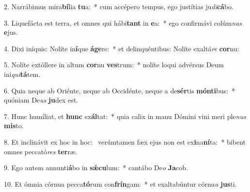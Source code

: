 2. Narrábimus mira\textbf{bí}lia \textbf{tu}a:~*  cum accépero tempus, ego justítias ju\textit{di}\textbf{cá}bo.\

3. Liquefácta est terra, et omnes qui hábi\textbf{tant} in \textbf{e}a:~*  ego confirmávi colúm\textit{nas} \textbf{e}jus.\

4. Dixi iníquis: Nolíte in\textbf{í}que \textbf{á}\textbf{ge}re:~*  et delinquéntibus: Nolíte exaltá\textit{re} \textbf{cor}nu:\

5. Nolíte extóllere in altum \textbf{cor}nu \textbf{ves}trum:~*  nolíte loqui advérsus Deum ini\textit{qui}\textbf{tá}tem.\

6. Quia neque ab Oriénte, neque ab Occidénte, neque a de\textbf{sér}tis \textbf{món}\textbf{ti}bus:~*  quóniam De\textit{us} \textbf{ju}dex est.\

7. Hunc humíliat, et \textbf{hunc} ex\textbf{ál}tat:~*  quia calix in manu Dómini vini meri ple\textit{nus} \textbf{mis}to.\

8. Et inclinávit ex hoc in hoc: \dag\  verúmtamen fæx ejus non est ex\textbf{i}na\textbf{ní}ta:~*  bibent omnes peccató\textit{res} \textbf{ter}ræ.\

9. Ego autem annunti\textbf{á}bo in \textbf{sǽ}\textbf{cu}lum:~*  cantábo De\textit{o} \textbf{Ja}cob.\

10. Et ómnia córnua pecca\textbf{tó}rum con\textbf{frín}gam:~*  et exaltabúntur córnu\textit{a} \textbf{jus}ti.\

